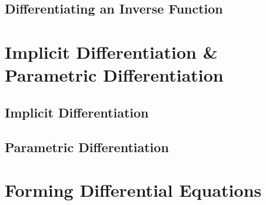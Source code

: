 \documentclass[../alevelmaths.tex]{subfiles}
\begin{document}
\subsection*{Differentiating an Inverse Function}
\section{Implicit Differentiation \& Parametric Differentiation}
\subsection*{Implicit Differentiation}
\subsection*{Parametric Differentiation}
\section{Forming Differential Equations}
\end{document}
